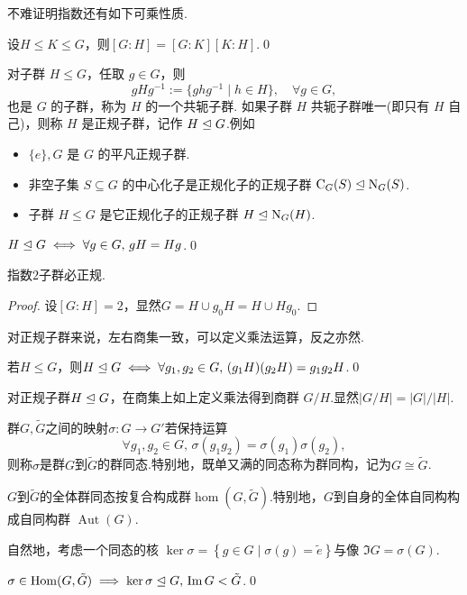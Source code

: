 不难证明指数还有如下可乘性质.
\begin{prop}
	设$H\le K\le G$，则$[G:H]=[G:K][K:H]$.\qed
\end{prop}

对子群 $H\le G$，任取 $g\in G$，则
\[
	gHg^{-1}:=\{ghg^{-1}\mid h\in H\},\quad\forall g\in G,
\]
也是 $G$ 的子群，称为 $H$ 的一个{\heiti 共轭子群}.
如果子群 $H$ 共轭子群唯一(即只有 $H$ 自己)，则称 $H$ 是{\heiti 正规子群}，记作 $H\trianglelefteq G$.例如
\begin{itemize}
	\item $\{e\},G$ 是 $G$ 的平凡正规子群.
	\item 非空子集 $S\subseteq G$ 的中心化子是正规化子的正规子群 $\mathrm{C}_G(S)\trianglelefteq\mathrm{N}_G(S)$.
	\item 子群 $H\le G$ 是它正规化子的正规子群 $H\trianglelefteq\mathrm{N}_G(H)$.
\end{itemize}
\begin{lemma}
	$H\trianglelefteq G\iff\forall g\in G,\,gH=Hg$.\qed
\end{lemma}
\begin{cor}
	指数$2$子群必正规.
\end{cor}
\begin{proof}
	设$[G:H]=2$，显然$G=H\cup g_0H=H\cup Hg_0$.
\end{proof}

对正规子群来说，左右商集一致，可以定义乘法运算，反之亦然.
\begin{lemma}
	若$H\le G$，则$H\trianglelefteq G\iff\forall g_1,g_2\in G,\,(g_1H)(g_2H)=g_1g_2H$.\qed
\end{lemma}

对正规子群$H\trianglelefteq G$，在商集上如上定义乘法得到{\heiti 商群} $G/H$.显然$|G/H|=|G|/|H|$.

\begin{definition}
	群$G,\tilde{G}$之间的映射$\sigma\colon G\to G'$若保持运算
	\[
		\forall g_1,g_2\in G,\,\sigma(g_1g_2)=\sigma(g_1)\sigma(g_2),
	\]
	则称$\sigma$是群$G$到$\tilde{G}$的{\heiti 群同态}.特别地，既单又满的同态称为{\heiti 群同构}，记为$G\cong\tilde{G}$.

	$G$到$\tilde{G}$的全体群同态按复合构成群$\hom(G,\tilde{G})$.特别地，$G$到自身的全体自同构构成{\heiti 自同构群} $\operatorname*{Aut}(G)$.
\end{definition}

自然地，考虑一个同态的{\heiti 核} $\ker\sigma=\left\{g\in G\mid \sigma(g)=\tilde{e}\right\}$与{\heiti 像} $\Im G=\sigma(G)$.
\begin{prop}
	$\sigma\in\operatorname*{Hom}(G,\tilde{G})\implies\ker\sigma\trianglelefteq G,\,\operatorname*{Im} G<\tilde{G}$.\qed
\end{prop}

